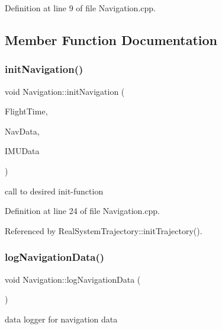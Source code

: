 Definition at line 9 of file Navigation.\+cpp.



\subsection{Member Function Documentation}
\mbox{\label{class_navigation_a4c870d2fe260f06003503c32e22fd1f3}} 
\subsubsection{\texorpdfstring{init\+Navigation()}{initNavigation()}}
{\footnotesize\ttfamily void Navigation\+::init\+Navigation (\begin{DoxyParamCaption}\item[{\hyperlink{group___tools_ga3f1431cb9f76da10f59246d1d743dc2c}{Float64} \&}]{Flight\+Time,  }\item[{Navigation\+Struct \&}]{Nav\+Data,  }\item[{I\+M\+U\+Struct \&}]{I\+M\+U\+Data }\end{DoxyParamCaption})}



call to desired init-\/function 



Definition at line 24 of file Navigation.\+cpp.



Referenced by Real\+System\+Trajectory\+::init\+Trajectory().

\mbox{\label{class_navigation_a6481240b0375c18dc9618746e9e47755}} 
\subsubsection{\texorpdfstring{log\+Navigation\+Data()}{logNavigationData()}}
{\footnotesize\ttfamily void Navigation\+::log\+Navigation\+Data (\begin{DoxyParamCaption}{ }\end{DoxyParamCaption})}



data logger for navigation data 



